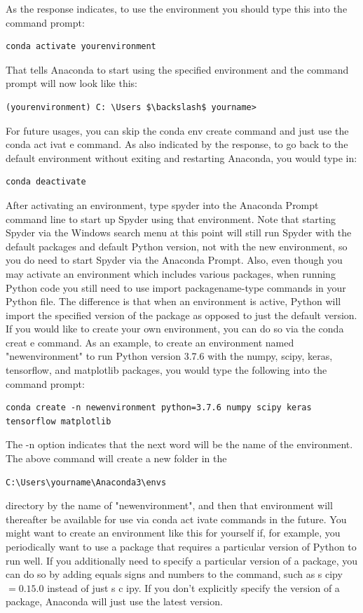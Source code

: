 \documentclass{book}
\theoremstyle{plain}
\theoremstyle{definition}
\numberwithin{exm}{chapter}
\theoremstyle{remark}
\theoremstyle{summary}
\theoremstyle{overview}
\begin{document}
As the response indicates, to use the environment you should type this into the command prompt:
\begin{lstlisting}
conda activate yourenvironment
\end{lstlisting}
That tells Anaconda to start using the specified environment and the command prompt will now look like this:
\begin{lstlisting}
(yourenvironment) C: \Users $\backslash$ yourname>
\end{lstlisting}
For future usages, you can skip the conda env create command and just use the conda act ivat e command. As also indicated by the response, to go back to the default environment without exiting and restarting Anaconda, you would type in:
\begin{lstlisting}
conda deactivate
\end{lstlisting}
After activating an environment, type spyder into the Anaconda Prompt command line to start up Spyder using that environment. Note that starting Spyder via the Windows search menu at this point will still run Spyder with the default packages and default Python version, not with the new environment, so you do need to start Spyder via the Anaconda Prompt. Also, even though you may activate an environment which includes various packages, when running Python code you still need to use import packagename-type commands in your Python file. The difference is that when an environment is active, Python will import the specified version of the package as opposed to just the default version.\\

If you would like to create your own environment, you can do so via the conda creat e command. As an example, to create an environment named "newenvironment" to run Python version 3.7.6 with the numpy, scipy, keras, tensorflow, and matplotlib packages, you would type the following into the command prompt:
\begin{lstlisting}
conda create -n newenvironment python=3.7.6 numpy scipy keras tensorflow matplotlib
\end{lstlisting}
The -n option indicates that the next word will be the name of the environment.
The above command will create a new folder in the
\begin{lstlisting}
C:\Users\yourname\Anaconda3\envs
\end{lstlisting}
directory by the name of "newenvironment", and then that environment will thereafter be available for use via conda act ivate commands in the future.
You might want to create an environment like this for yourself if, for example, you periodically want to use a package that requires a particular version of Python to run well. If you additionally need to specify a particular version of a package, you can do so by adding equals signs and numbers to the command, such as s cipy $=0.15 .0$ instead of just s c ipy. If you don't explicitly specify the version of a package, Anaconda will just use the latest version.\\
\end{document}
